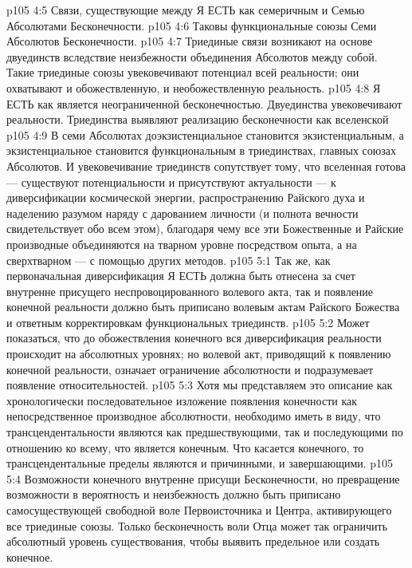 \vs p105 4:5 \bibnobreakspace {} Связи, существующие между Я ЕСТЬ как семеричным и Семью Абсолютами Бесконечности.
\vs p105 4:6 \bibnobreakspace {} Таковы функциональные союзы Семи Абсолютов Бесконечности.
\vs p105 4:7 \pc Триединые связи возникают на основе двуединств вследствие неизбежности объединения Абсолютов между собой. Такие триединые союзы увековечивают потенциал всей реальности; они охватывают и обожествленную, и необожествленную реальность.
\vs p105 4:8 Я ЕСТЬ как  является неограниченной бесконечностью. Двуединства увековечивают  реальности. Триединства выявляют реализацию бесконечности как вселенской 
\vs p105 4:9 В семи Абсолютах доэкзистенциальное становится экзистенциальным, а экзистенциальное становится функциональным в триединствах, главных союзах Абсолютов. И увековечивание триединств сопутствует тому, что вселенная готова --- существуют потенциальности и присутствуют актуальности --- к диверсификации космической энергии, распространению Райского духа и наделению разумом наряду с дарованием личности (и полнота вечности свидетельствует обо всем этом), благодаря чему все эти Божественные и Райские производные объединяются на тварном уровне посредством опыта, а на сверхтварном --- с помощью других методов.
\vs p105 5:1 Так же, как первоначальная диверсификация Я ЕСТЬ должна быть отнесена за счет внутренне присущего неспровоцированного волевого акта, так и появление конечной реальности должно быть приписано волевым актам Райского Божества и ответным корректировкам функциональных триединств.
\vs p105 5:2 Может показаться, что до обожествления конечного вся диверсификация реальности происходит на абсолютных уровнях; но волевой акт, приводящий к появлению конечной реальности, означает ограничение абсолютности и подразумевает появление относительностей.
\vs p105 5:3 \pc Хотя мы представляем это описание как хронологически последовательное изложение появления конечности как непосредственное производное абсолютности, необходимо иметь в виду, что трансцендентальности являются как предшествующими, так и последующими по отношению ко всему, что является конечным. Что касается конечного, то трансцендентальные пределы являются и причинными, и завершающими.
\vs p105 5:4 \pc Возможности конечного внутренне присущи Бесконечности, но превращение возможности в вероятность и неизбежность должно быть приписано самосуществующей свободной воле Первоисточника и Центра, активирующего все триединые союзы. Только бесконечность воли Отца может так ограничить абсолютный уровень существования, чтобы выявить предельное или создать конечное.
